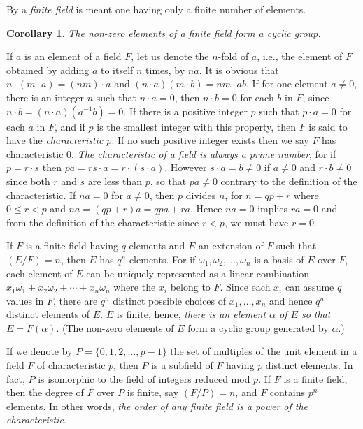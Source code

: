 \documentclass[10pt,leqno]{article}
\newtheorem*{coro*}{Corollary}
\theoremstyle{definition}
\begin{document}
By a \emph{finite field} is meant one having only a finite number of elements.


\begin{coro*}
\label{coro:p53}
The non-zero elements of a finite field form a cyclic group.
\end{coro*}


If $a$ is an element of a field $F$, let us denote the $n$-fold of $a$, i.e., the element of $F$ obtained by adding $a$ to itself $n$ times, by $na$.
It is obvious that $n\cdot(m\cdot a) = (nm) \cdot a$ and $(n \cdot a) (m \cdot b) = nm \cdot ab$.
If for one element $a \not= 0$, there is an integer $n$ such that $n \cdot a = 0$, then $n \cdot b = 0$ for each $b$ in $F$, since $n \cdot b = (n \cdot a)(a^{-1}b) = 0$.
If there is a positive integer $p$ such that $p \cdot a = 0$ for each $a$ in $F$, and if $p$ is the smallest integer with this property, then $F$ is said to have the \emph{characteristic $p$}.
If no such positive integer exists then we say $F$ has characteristic $0$.
\emph{The characteristic of a field is always a prime number}, for if $p = r \cdot s$ then $pa = rs \cdot a = r \cdot (s \cdot a)$.
However $s \cdot a = b \not= 0$ if $a \not= 0$ and $r \cdot b \not= 0$ since both $r$ and $s$ are less than $p$, so that $pa \not= 0$ contrary to the definition of the characteristic.
If $na = 0$ for $a \not= 0$, then $p$ divides $n$, for $n = qp + r$ where $0 \leq r < p$ and $na = (qp + r)a = qpa + ra$.
Hence $na = 0$ implies $ra = 0$ and from the definition of the characteristic since $r < p$, we must have $r = 0$.

If $F$ is a finite field having $q$ elements and $E$ an extension of $F$ such that $(E/F) = n$, then $E$ has $q^n$ elements.
For if $\omega_1, \omega_2, \ldots, \omega_n$ is a basis of $E$ over $F$, each element of $E$ can be uniquely represented as a linear combination $x_1 \omega_1 + x_2 \omega_2 + \cdots + x_n \omega_n$ where the $x_i$ belong to $F$.
Since each $x_i$ can assume $q$ values in $F$, there are $q^n$ distinct possible choices of $x_1,\ldots,x_n$ and hence $q^n$ distinct elements of $E$.
$E$ is finite, hence, \emph{there is an element $\alpha$ of $E$ so that $E = F(\alpha)$}.
(The non-zero elements of $E$ form a cyclic group generated by $\alpha$.)

If we denote by $P = \{0,1,2,\ldots,p-1\}$ the set of multiples of the unit element in a field $F$ of characteristic $p$, then $P$ is a subfield of $F$ having $p$ distinct elements.
In fact, $P$ is isomorphic to the field of integers reduced mod $p$.
If $F$ is a finite field, then the degree of $F$ over $P$ is finite, say $(F/P) = n$, and $F$ contains $p^n$ elements.
In other words, \emph{the order of any finite field is a power of the characteristic}.
\end{document}
